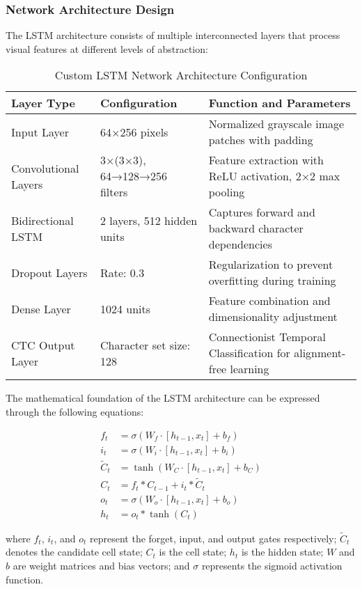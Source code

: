 \subsubsection{Network Architecture Design}

The LSTM architecture consists of multiple interconnected layers that process visual features at different levels of abstraction:

\begin{table}[H]
\centering
\caption{Custom LSTM Network Architecture Configuration}
\label{tab:lstm_architecture}
\begin{tabular}{|l|l|p{7cm}|}
\hline
\textbf{Layer Type} & \textbf{Configuration} & \textbf{Function and Parameters} \\
\hline
Input Layer & 64×256 pixels & Normalized grayscale image patches with padding \\
\hline
Convolutional Layers & 3×(3×3), 64→128→256 filters & Feature extraction with ReLU activation, 2×2 max pooling \\
\hline
Bidirectional LSTM & 2 layers, 512 hidden units & Captures forward and backward character dependencies \\
\hline
Dropout Layers & Rate: 0.3 & Regularization to prevent overfitting during training \\
\hline
Dense Layer & 1024 units & Feature combination and dimensionality adjustment \\
\hline
CTC Output Layer & Character set size: 128 & Connectionist Temporal Classification for alignment-free learning \\
\hline
\end{tabular}
\end{table}

The mathematical foundation of the LSTM architecture can be expressed through the following equations:

\begin{align}
    f_t &= \sigma(W_f \cdot [h_{t-1}, x_t] + b_f) \\
    i_t &= \sigma(W_i \cdot [h_{t-1}, x_t] + b_i) \\
    \tilde{C}_t &= \tanh(W_C \cdot [h_{t-1}, x_t] + b_C) \\
    C_t &= f_t * C_{t-1} + i_t * \tilde{C}_t \\
    o_t &= \sigma(W_o \cdot [h_{t-1}, x_t] + b_o) \\
    h_t &= o_t * \tanh(C_t)
\end{align}

where $f_t$, $i_t$, and $o_t$ represent the forget, input, and output gates respectively; $\tilde{C}_t$ denotes the candidate cell state; $C_t$ is the cell state; $h_t$ is the hidden state; $W$ and $b$ are weight matrices and bias vectors; and $\sigma$ represents the sigmoid activation function.

